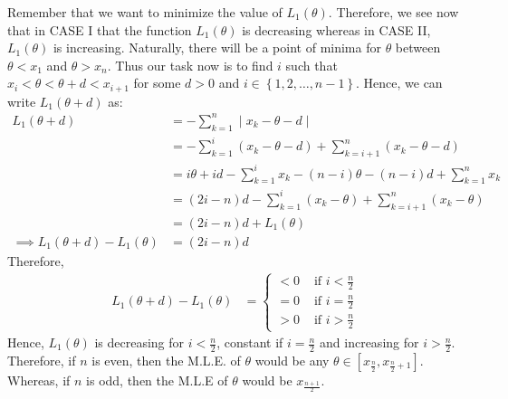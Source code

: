 \documentclass[a4paper]{article}
\begin{document}
Remember that we want to minimize the value of $L_1\left( \theta \right)$. Therefore, we see now that in CASE I that the function $L_1\left( \theta \right) $ is decreasing whereas in CASE II, $L_1\left( \theta \right) $ is increasing.
\newline\newline
Naturally, there will be a point of minima for $\theta$ between $\theta<x_1$ and $\theta>x_n$.
\newline\newline
Thus our task now is to find $i$ such that $x_{i} < \theta< \theta+d < x_{i+1}$ for some $d > 0$ and $i \in  \left\{ 1,2,\dots,n-1 \right\} $. Hence, we can write $L_1\left( \theta+d \right) $ as:
\begin{equation*}
	\begin{split}
		L_1\left( \theta+d \right)  &= -\sum_{k=1}^{n}   \mid x_{k} - \theta - d \mid\\ 
		&= -\sum_{k=1}^{i} \left( x_{k}- \theta - d \right) + \sum_{k=i+1}^{n} \left( x_{k} -\theta - d\right) \\
		&= i\theta + id -\sum_{k=1}^{i} x_k -\left( n-i \right) \theta -\left( n-i \right) d + \sum_{k=1}^{n} x_k\\
		&= \left( 2i - n \right) d  -\sum_{k = 1}^{i} \left( x_k-\theta \right)  + \sum_{k=i+1}^{n} \left( x_k - \theta \right)\\
		&= \left( 2i-n \right) d +  L_1\left( \theta \right)\\
		\implies L_1\left( \theta+d \right) - L_1\left( \theta \right) &= \left( 2i - n \right) d
	\end{split}
\end{equation*}
Therefore,
\begin{equation*}
	\begin{split}
		L_1\left( \theta+d \right)  - L_1\left( \theta \right) &= \begin{cases}
			<0 &\text{ if } i<\frac{n}{2}\\
			=0 &\text{ if } i = \frac{n}{2}\\
			>0 &\text{ if } i>\frac{n}{2}
		\end{cases}
	\end{split}
\end{equation*}
Hence, $L_1\left( \theta \right) $ is decreasing for $i<\frac{n}{2}$, constant if $i = \frac{n}{2}$ and increasing for $i>\frac{n}{2}$.
\newline\newline
Therefore, if $n$ is even, then the M.L.E. of $\theta$ would be any $\theta\in \left[ x_{\frac{n}{2}}, x_{\frac{n}{2}+1} \right] $.
\newline\newline
Whereas, if $n$ is odd, then the M.L.E of  $\theta$ would be $x_{\frac{n+1}{2}}$.
\end{document}
